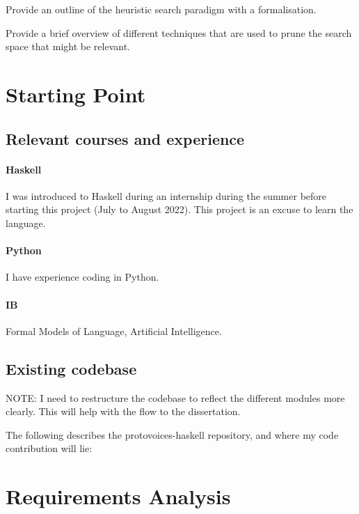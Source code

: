 \documentclass[12pt,a4paper,twoside,openright]{report}
\begin{document}
Provide an outline of the heuristic search paradigm with a formalisation.
\par
Provide a brief overview of different techniques that are used to prune the search space that might be relevant.

\section{Starting Point}

\subsection{Relevant courses and experience}

\paragraph{Haskell}{I was introduced to Haskell during an internship during the summer before starting this project (July to August 2022). This project is an excuse to learn the language.}
\paragraph{Python}{I have experience coding in Python.}

\paragraph{IB}{ Formal Models of Language, Artificial Intelligence.}

\subsection{Existing codebase}
NOTE: I need to restructure the codebase to reflect the different modules more clearly. This will help with the flow to the dissertation.

The following describes the protovoices-haskell repository, and where my code contribution will lie:
\par
\medskip
{}

\section{Requirements Analysis}
\end{document}
